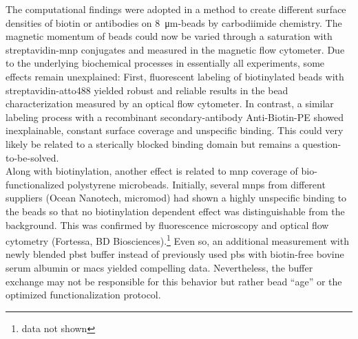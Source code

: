 The computational findings were adopted in a method to create different surface densities of biotin or antibodies on \SI{8}{\micro\meter}-beads by carbodiimide chemistry. The magnetic momentum of beads could now be varied through a saturation with streptavidin-\gls{mnp} conjugates and measured in the magnetic flow cytometer. 
Due to the underlying biochemical processes in essentially all experiments, some effects remain unexplained: First, fluorescent labeling of biotinylated beads with strept\-avidin-atto488 yielded robust and reliable results in the bead characterization measured by an optical flow cytometer. In contrast, a similar labeling process with a recombinant secondary-antibody Anti-Biotin-PE showed inexplainable, constant surface coverage and unspecific binding. This could very likely be related to a sterically blocked binding domain but remains a question-to-be-solved.\\
Along with biotinylation, another effect is related to \gls{mnp} coverage of bio-functionalized polystyrene microbeads. Initially, several \glspl{mnp} from different suppliers (Ocean Nanotech, micromod) had shown a highly unspecific binding to the beads so that no biotinylation dependent effect was distinguishable from the background. This was confirmed by fluorescence microscopy and optical flow cytometry (Fortessa, BD Biosciences).\footnote{data not shown} Even so, an additional measurement with newly blended \gls{pbst} buffer instead of previously used \gls{pbs} with biotin-free bovine serum albumin or \gls{macs} yielded compelling data. Nevertheless, the buffer exchange may not be responsible for this behavior but rather bead ``age'' or the optimized functionalization protocol.

